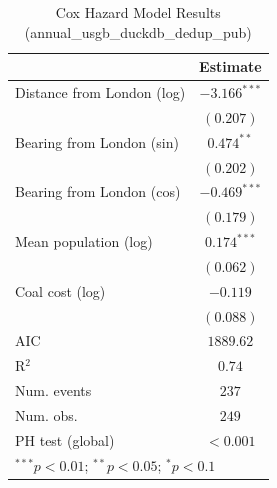
\begin{table}
\begin{center}
\begin{tabular}{l c}
\hline
 & Estimate \\
\hline
Distance from London (log) & $-3.166^{***}$ \\
 & $(0.207)$ \\
Bearing from London (sin) & $0.474^{**}$ \\
 & $(0.202)$ \\
Bearing from London (cos) & $-0.469^{***}$ \\
 & $(0.179)$ \\
Mean population (log) & $0.174^{***}$ \\
 & $(0.062)$ \\
Coal cost (log) & $-0.119$ \\
 & $(0.088)$ \\
\hline
AIC              & $1889.62$ \\
R$^2$            & $0.74$ \\
Num. events      & $237$ \\
Num. obs.        & $249$ \\
PH test (global) & $<0.001$ \\
\hline
\multicolumn{2}{l}{\scriptsize{$^{***}p<0.01$; $^{**}p<0.05$; $^{*}p<0.1$}}
\end{tabular}
\caption{Cox Hazard Model Results (annual\_usgb\_duckdb\_dedup\_pub)}
\label{tab:cox_annual_usgb_duckdb_dedup_pub}
\end{center}
\end{table}
